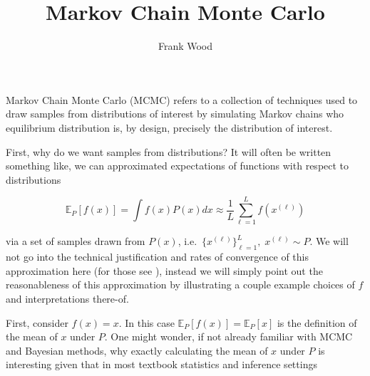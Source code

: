\documentclass[11pt]{amsart}
\title{Markov Chain Monte Carlo}
\author{Frank Wood}
\begin{document}
\maketitle

Markov Chain Monte Carlo (MCMC) refers to a collection of techniques used to draw samples from distributions of interest by simulating Markov chains who equilibrium distribution is, by design,  precisely the distribution of interest. 

First, why do we want samples from distributions?  It will often be written something like, we can approximated  expectations of functions with respect to distributions

\[ \mathbb{E}_P[f(x)] = \int f(x) P(x) dx \approx \frac{1}{L} \sum_{\ell=1}^L f(x^{(\ell)})\]

via a set of samples drawn from $P(x)$, i.e.~$\{x^{(\ell)}\}_{\ell=1}^L, \; x^{(\ell)} \sim P$.  We will not go into the technical justification and rates of convergence of this approximation here (for those see \cite{neal,liu,etc}), instead we will simply point out the reasonableness of this approximation by illustrating a couple example choices of $f$ and interpretations there-of.  

First, consider $f(x) = x$.  In this case $\mathbb{E}_P[f(x)] = \mathbb{E}_P[x]$ is the definition of the mean of $x$ under $P$.  One might wonder, if not already familiar with MCMC and Bayesian methods, why exactly calculating the mean of $x$ under $P$ is interesting given that in most textbook statistics and inference settings
\end{document}
